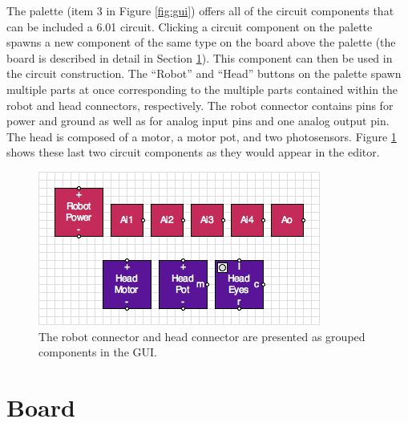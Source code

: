The palette (item $3$ in Figure \ref{fig:gui}) offers all of the circuit
components that can be included a 6.01 circuit. Clicking a circuit component on
the palette spawns a new component of the same type on the board above
the palette (the board is described in detail in Section \ref{sec:board}).
This component can then be used in the circuit construction. The
``Robot'' and ``Head'' buttons on the palette spawn multiple parts at once
corresponding to the multiple parts contained within the robot and head
connectors, respectively. The robot
connector contains pins for power and ground as well as for analog input pins
and one analog output pin. The head is composed of a motor, a motor pot, and
two photosensors. Figure \ref{fig:robot_head_parts} shows these last two
circuit components as they would appear in the editor.

\begin{figure}
\begin{center}
\includegraphics[scale=0.75]{Images/robot_head_parts.png}
\caption[GUI grouped components]{The robot connector and head connector are
presented as grouped components in the GUI.}
\label{fig:robot_head_parts}
\end{center}
\end{figure}

\section{Board}
\label{sec:board}

